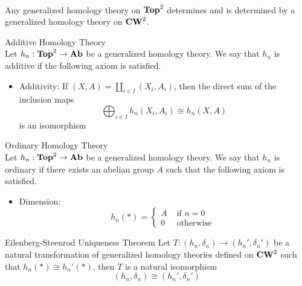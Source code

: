 \documentclass[a4paper]{article}
\begin{document}
\begin{prp}{}{}\\
Any generalized homology theory on $\bold{Top}^2$ determines and is determined by a generalized homology theory on $\bold{CW}^2$.
\end{prp}

\begin{defn}{Additive Homology Theory}{}\\
Let $h_n:\bold{Top}^2\to\bold{Ab}$ be a generalized homology theory. We say that $h_n$ is additive if the following axiom is satisfied. 
\begin{itemize}
\item Additivity: If $(X,A)=\coprod_{i\in I}(X_i,A_i)$, then the direct sum of the inclusion maps $$\bigoplus_{i\in I}h_n(X_i,A_i)\cong h_n(X,A)$$ is an isomorphism
\end{itemize}
\end{defn}

\begin{defn}{Ordinary Homology Theory}{}\\
Let $h_n:\bold{Top}^2\to\bold{Ab}$ be a generalized homology theory. We say that $h_n$ is ordinary if there exists an abelian group $A$ such that the following axiom is satisfied. 
\begin{itemize}
\item Dimension: $$h_n(\ast)=\begin{cases}
A & \text{ if } n=0\\
0 & \text{ otherwise }
\end{cases}$$
\end{itemize}
\end{defn}

\begin{thm}{Eilenberg-Steenrod Uniqueness Theorem}{} Let $T:(h_n,\delta_n)\to(h_n',\delta_n')$ be a natural transformation of generalized homology theories defined on $\bold{CW}^2$ such that $h_n(\ast)\cong h_n'(\ast)$, then $T$ is a natural isomorphism $$(h_n,\delta_n)\cong(h_n',\delta_n')$$
\end{thm}
\end{document}
